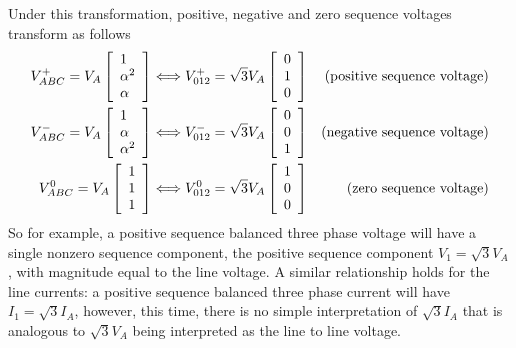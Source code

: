 \documentclass[11pt]{article}
\begin{document}
Under this transformation, positive, negative and zero sequence voltages transform as follows
\begin{align}
V_{ABC}^+ = V_A\left[\begin{array}{l} 
	1 \\ \alpha^2 \\ \alpha 
\end{array}\right] &\Longleftrightarrow 
V_{012}^+ = \sqrt{3}V_A\left[\begin{array}{l} 
	0 \\ 1 \\ 0
\end{array}\right] & \text{(positive sequence voltage)}\notag \\
V_{ABC}^- = V_A\left[\begin{array}{l} 
	1 \\ \alpha \\ \alpha^2
\end{array}\right] &\Longleftrightarrow 
V_{012}^- = \sqrt{3}V_A\left[\begin{array}{l} 
	0 \\ 0 \\ 1
\end{array}\right] & \text{(negative sequence voltage)}\notag \\
V_{ABC}^0 = V_A\left[\begin{array}{l} 
	1 \\ 1 \\ 1
\end{array}\right] &\Longleftrightarrow 
V_{012}^0 = \sqrt{3}V_A\left[\begin{array}{l} 
	1 \\ 0 \\ 0
\end{array}\right] & \text{(zero sequence voltage)}\notag \\
\end{align}
So for example, a positive sequence balanced three phase voltage will have a single nonzero sequence component, the positive sequence component $V_1 = \sqrt{3}V_A$, with magnitude equal to the line voltage. A similar relationship holds for the line currents: a positive sequence balanced three phase current will have $I_1 = \sqrt{3}I_A$, however, this time, there is no simple interpretation of $\sqrt{3}I_A$ that is analogous to $\sqrt{3}V_A$ being interpreted as the line to line voltage.
\end{document}
